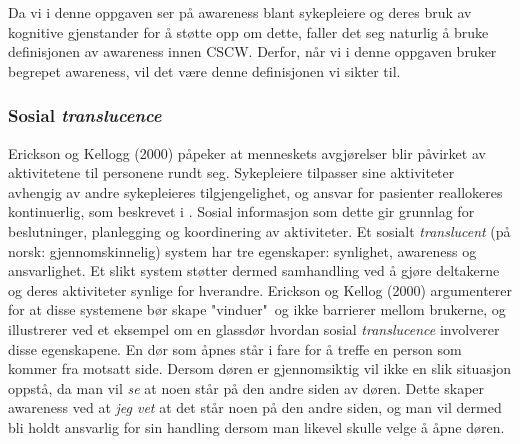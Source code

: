 \noindent
Da vi i denne oppgaven ser på awareness blant sykepleiere og deres bruk av kognitive gjenstander for å støtte opp om dette, faller det seg naturlig å bruke definisjonen av awareness innen CSCW. Derfor, når vi i denne oppgaven bruker begrepet awareness, vil det være denne definisjonen vi sikter til.

\subsubsection{Sosial \emph{translucence}}
Erickson og Kellogg (2000) påpeker at menneskets avgjørelser blir påvirket av aktivitetene til personene rundt seg. Sykepleiere tilpasser sine aktiviteter avhengig av andre sykepleieres tilgjengelighet, og ansvar for pasienter reallokeres kontinuerlig, som beskrevet i \cite{KlemetsRedundancy}. Sosial informasjon som dette gir grunnlag for beslutninger, planlegging og koordinering av aktiviteter. Et sosialt \emph{translucent} (på norsk: gjennomskinnelig) system har tre egenskaper: synlighet, awareness og ansvarlighet. Et slikt system støtter dermed samhandling ved å gjøre deltakerne og deres aktiviteter synlige for hverandre. Erickson og Kellog (2000) argumenterer for at disse systemene bør skape "vinduer"\ og ikke barrierer mellom brukerne, og illustrerer ved et eksempel om en glassdør hvordan sosial \emph{translucence} involverer disse egenskapene. En dør som åpnes står i fare for å treffe en person som kommer fra motsatt side. Dersom døren er gjennomsiktig vil ikke en slik situasjon oppstå, da man vil \emph{se} at noen står på den andre siden av døren. Dette skaper awareness ved at \emph{jeg vet} at det står noen på den andre siden, og man vil dermed bli holdt ansvarlig for sin handling dersom man likevel skulle velge å åpne døren.
